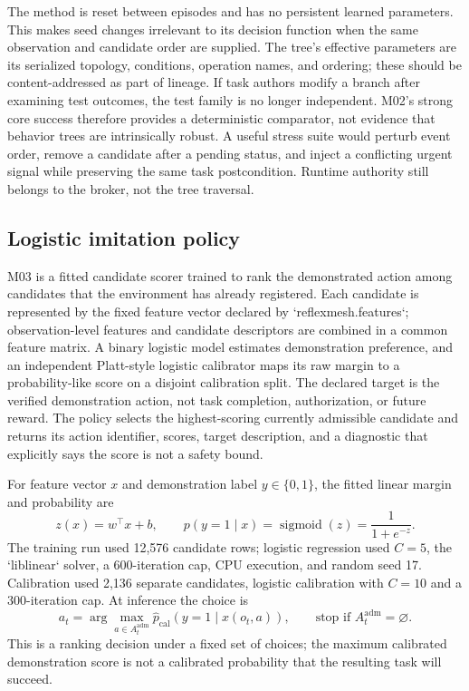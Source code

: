 The method is reset between episodes and has no persistent learned parameters. This makes seed changes irrelevant to its decision function when the same observation and candidate order are supplied. The tree's effective parameters are its serialized topology, conditions, operation names, and ordering; these should be content-addressed as part of lineage. If task authors modify a branch after examining test outcomes, the test family is no longer independent. M02's strong core success therefore provides a deterministic comparator, not evidence that behavior trees are intrinsically robust. A useful stress suite would perturb event order, remove a candidate after a pending status, and inject a conflicting urgent signal while preserving the same task postcondition. Runtime authority still belongs to the broker, not the tree traversal.

\subsection{Logistic imitation policy}\label{sec:method-m03}
M03 is a fitted candidate scorer trained to rank the demonstrated action among candidates that the environment has already registered. Each candidate is represented by the fixed feature vector declared by `reflexmesh.features`; observation-level features and candidate descriptors are combined in a common feature matrix. A binary logistic model estimates demonstration preference, and an independent Platt-style logistic calibrator maps its raw margin to a probability-like score on a disjoint calibration split. The declared target is the verified demonstration action, not task completion, authorization, or future reward. The policy selects the highest-scoring currently admissible candidate and returns its action identifier, scores, target description, and a diagnostic that explicitly says the score is not a safety bound.

For feature vector $x$ and demonstration label $y\in\{0,1\}$, the fitted linear margin and probability are
\begin{equation}
z(x)=w^\top x+b,\qquad p(y=1\mid x)=\operatorname{sigmoid}(z)=\frac{1}{1+e^{-z}}.
\end{equation}
The training run used 12,576 candidate rows; logistic regression used $C=5$, the `liblinear` solver, a 600-iteration cap, CPU execution, and random seed 17. Calibration used 2,136 separate candidates, logistic calibration with $C=10$ and a 300-iteration cap. At inference the choice is
\begin{equation}
a_t=\arg\max_{a\in A_t^{\mathrm{adm}}}\widehat p_{\mathrm{cal}}(y=1\mid x(o_t,a)),\qquad
\text{stop if }A_t^{\mathrm{adm}}=\varnothing.
\end{equation}
This is a ranking decision under a fixed set of choices; the maximum calibrated demonstration score is not a calibrated probability that the resulting task will succeed.

